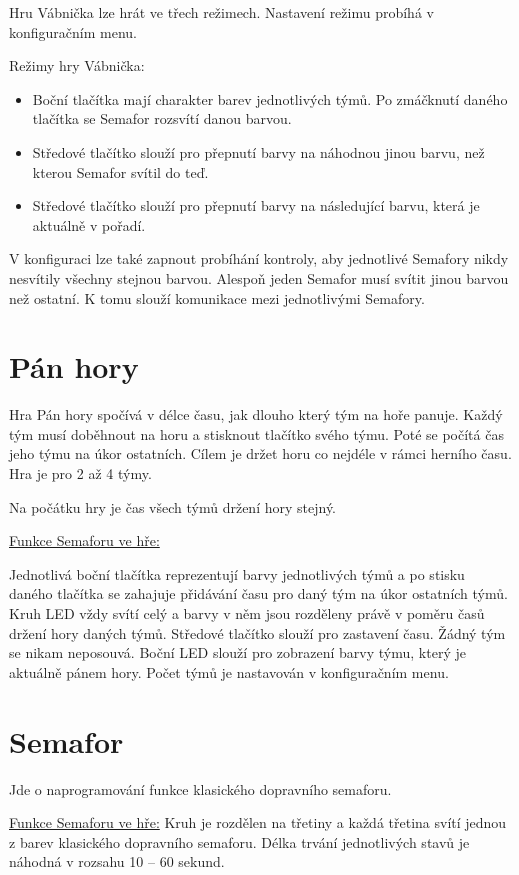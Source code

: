 Hru Vábnička lze hrát ve třech režimech. Nastavení režimu probíhá v konfiguračním menu. 

Režimy hry Vábnička: 
\begin{itemize} 
  \item Boční tlačítka mají charakter barev jednotlivých týmů. Po zmáčknutí daného tlačítka se Semafor rozsvítí danou barvou. 
  \item Středové tlačítko slouží pro přepnutí barvy na náhodnou jinou barvu, než kterou Semafor svítil do teď.  
  \item Středové tlačítko slouží pro přepnutí barvy na následující barvu, která je aktuálně v pořadí. 
\end{itemize}	
V konfiguraci lze také zapnout probíhání kontroly, aby jednotlivé Semafory nikdy nesvítily všechny stejnou barvou. Alespoň jeden Semafor musí svítit jinou barvou než ostatní. 
K tomu slouží komunikace mezi jednotlivými Semafory.

\section{Pán hory}
Hra Pán hory spočívá v délce času, jak dlouho který tým na hoře panuje. Každý tým musí doběhnout na horu a stisknout tlačítko svého týmu. Poté se počítá čas jeho týmu na úkor 
ostatních. Cílem je držet horu co nejdéle v rámci herního času. Hra je pro 2 až 4 týmy. 

Na počátku hry je čas všech týmů držení hory stejný. 

\underline{Funkce Semaforu ve hře:}

Jednotlivá boční tlačítka reprezentují barvy jednotlivých týmů a po stisku daného tlačítka se zahajuje přidávání času pro daný tým na úkor ostatních týmů. Kruh LED vždy svítí celý 
a barvy v něm jsou rozděleny právě v poměru časů držení hory daných týmů. Středové tlačítko slouží pro zastavení času. Žádný tým se nikam neposouvá. Boční LED slouží pro zobrazení 
barvy týmu, který je aktuálně pánem hory. Počet týmů je nastavován v konfiguračním menu. 

\section{Semafor}
Jde o naprogramování funkce klasického dopravního semaforu. 

\underline{Funkce Semaforu ve hře:}
Kruh je rozdělen na třetiny a každá třetina svítí jednou z barev klasického dopravního semaforu. Délka trvání jednotlivých stavů je náhodná v rozsahu 10 – 60 sekund. 


